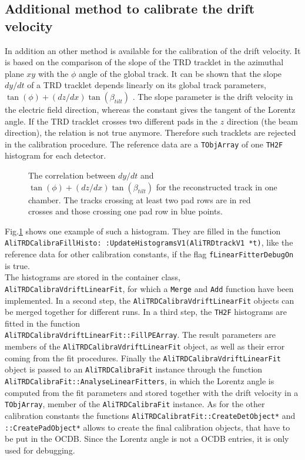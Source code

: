 \documentclass{alicetdr}
\begin{document}
\subsection{Additional method to calibrate the drift velocity}
In addition an other method is available for the calibration of the 
drift velocity. It is based on the comparison of the slope of the TRD 
tracklet in the azimuthal plane $xy$ with the $\phi$ angle of the 
global track. It can be shown that the slope $dy/dt$ of a TRD tracklet 
depends linearly on its global track parameters, 
$\tan(\phi)+(dz/dx)\tan(\beta_{tilt})$ \cite{THESISR}. The slope 
parameter is the drift velocity in the electric field direction, 
whereas the constant gives the tangent of the Lorentz angle. If the 
TRD tracklet crosses two different pads in the $z$ direction (the 
beam direction), the relation is not true anymore. Therefore such 
tracklets are rejected in the calibration procedure. The reference 
data are a {\tt TObjArray} of one {\tt TH2F} histogram for each 
detector.\\
\begin{figure}[hbt]
  \centering\mbox{}
  \caption{\label{crossrow}The correlation between $dy/dt$ and 
$\tan(\phi)+(dz/dx)\tan(\beta_{tilt})$ for the reconstructed track 
in one chamber. The tracks crossing at least two pad rows are in 
red crosses and those crossing one pad row in blue points.}
\end{figure}

Fig.\ref{crossrow} shows one example of such a histogram. They are 
filled in the function 
\\{\tt AliTRDCalibraFillHisto: :UpdateHistogramsV1(AliTRDtrackV1 *t)}, 
like the reference data for other calibration constants, if the 
flag {\tt fLinearFitterDebugOn} is true.\\
The histograms are stored in the container class, 
\\{\tt AliTRDCalibraVdriftLinearFit}, for which a {\tt Merge} and 
{\tt Add} function have been implemented. In a second step, the 
{\tt AliTRDCalibraVdriftLinearFit} objects can be merged together 
for different runs. In a third step, the {\tt TH2F} histograms are 
fitted in the function \\{\tt AliTRDCalibraVdriftLinearFit::FillPEArray}. 
The result parameters are members of the 
{\tt AliTRDCalibraVdriftLinearFit} object, as well as their error 
coming from the fit procedures. Finally the 
{\tt AliTRDCalibraVdriftLinearFit} object is passed to an 
{\tt AliTRDCalibraFit} instance through the function 
{\tt AliTRDCalibraFit::AnalyseLinearFitters}, in which the Lorentz 
angle is computed from the fit parameters and stored together with 
the drift velocity in a {\tt TObjArray}, member of the 
{\tt AliTRDCalibraFit} instance. As for the other calibration 
constants the functions {\tt AliTRDCalibratFit::CreateDetObject*} 
and {\tt ::CreatePadObject*} allows to create the final calibration 
objects, that have to be put in the OCDB. Since the Lorentz angle 
is not a OCDB entries, it is only used for debugging.
%       
\end{document}
